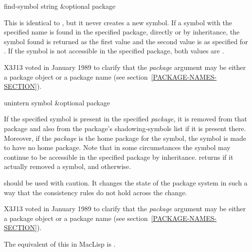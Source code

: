 \begin{defun}[Function]
find-symbol string &optional package

This is identical to , but it never creates a new symbol.  If
a symbol with the specified name is found in the specified package,
directly or by inheritance, the symbol found is returned as the first
value and the second value is as specified for .  If the
symbol is not accessible in the specified package, both values are
{\false}.

\begin{new}
X3J13 voted in January 1989
to clarify that the {\it package} argument may be either a package object
or a package name (see section~\ref{PACKAGE-NAMES-SECTION}).
\end{new}
\end{defun}

\begin{defun}[Function]
unintern symbol &optional package

If the specified symbol is present in the specified {\it package}, it is
removed from that package and also from the package's shadowing-symbols
list if it is present there.  Moreover, if the {\it package} is the home
package for the symbol, the symbol is made to have no home package.
Note that in some circumstances the symbol may continue to be accessible
in the specified package by inheritance.
 returns {\true} if it actually removed a symbol,
and {\false} otherwise.

 should be used with caution.  It changes the state of the
package system in such a way that the consistency rules do not hold
across the change.

\begin{new}
X3J13 voted in January 1989
to clarify that the {\it package} argument may be either a package object
or a package name (see section~\ref{PACKAGE-NAMES-SECTION}).
\end{new}

\beforenoterule
\begin{incompatibility}
The equivalent of this in MacLisp is .
\end{incompatibility}
\afternoterule
\end{defun}

